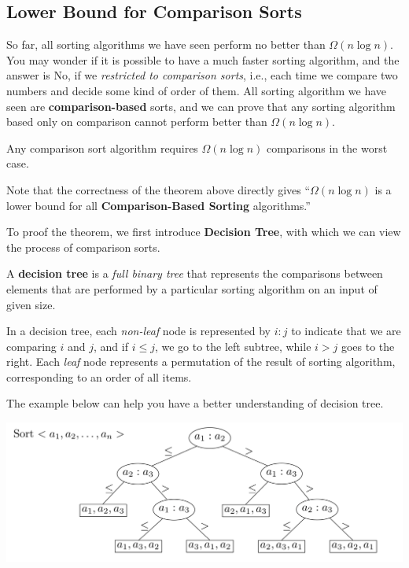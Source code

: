 \begin{spacing}{1.3}
    \section{Lower Bound for Comparison Sorts}

    So far, all sorting algorithms we have seen perform no better than $\Omega (n \log n)$. 
    You may wonder if it is possible to have a much faster sorting algorithm,
    and the answer is No, if we {\it restricted to comparison sorts}, i.e., each time we 
    compare two numbers and decide some kind of order of them. All sorting algorithm we have seen 
    are {\bf comparison-based} sorts, and we can prove that any sorting algorithm based only on 
    comparison cannot perform better than $\Omega (n\log n)$.

    \begin{theorem}
        Any comparison sort algorithm requires $\Omega (n\log n)$ comparisons in the worst case.
    \end{theorem}

    Note that the correctness of the theorem above directly gives ``$\Omega(n\log n)$ is a 
    lower bound for all {\bf Comparison-Based Sorting} algorithms.''

    To proof the theorem, we first introduce {\bf Decision Tree}, with which we can view 
    the process of comparison sorts. 
    \begin{definition}
        A {\bf decision tree} is a {\it full binary tree} that represents the comparisons between 
        elements that are performed by a particular sorting algorithm on an input of given size.
    \end{definition}
    In a decision tree, each {\it non-leaf} node is represented by $i:j$ to indicate that we are comparing 
    $i$ and $j$, and if $i\le j$, we go to the left subtree, while $i>j$ goes to the right.
    Each {\it leaf} node represents a permutation of the result of sorting algorithm, corresponding to 
    an order of all items.

    The example below can help you have a better understanding of decision tree.
    \begin{center}
        \includegraphics[scale=0.45]{images/06-decision-tree.png}
    \end{center}


\end{spacing}
